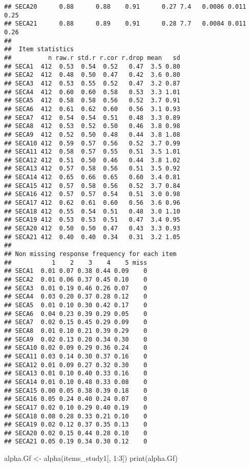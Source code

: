 \documentclass[
]{article}
\newenvironment{Shaded}{\begin{snugshade}}{\end{snugshade}}
\newcommand{\DecValTok}[1]{\textcolor[rgb]{0.00,0.00,0.81}{#1}}
\newcommand{\FunctionTok}[1]{\textcolor[rgb]{0.00,0.00,0.00}{#1}}
\newcommand{\NormalTok}[1]{#1}
\newcommand{\OtherTok}[1]{\textcolor[rgb]{0.56,0.35,0.01}{#1}}
\newcommand{\SpecialCharTok}[1]{\textcolor[rgb]{0.00,0.00,0.00}{#1}}
\begin{document}
\begin{verbatim}
## SECA20      0.88      0.88    0.91      0.27 7.4   0.0086 0.011  0.25
## SECA21      0.88      0.89    0.91      0.28 7.7   0.0084 0.011  0.26
## 
##  Item statistics 
##          n raw.r std.r r.cor r.drop mean   sd
## SECA1  412  0.53  0.54  0.52   0.47  3.5 0.80
## SECA2  412  0.48  0.50  0.47   0.42  3.6 0.80
## SECA3  412  0.53  0.55  0.52   0.47  3.2 0.87
## SECA4  412  0.60  0.60  0.58   0.53  3.3 1.01
## SECA5  412  0.58  0.58  0.56   0.52  3.7 0.91
## SECA6  412  0.61  0.62  0.60   0.56  3.1 0.93
## SECA7  412  0.54  0.54  0.51   0.48  3.3 0.89
## SECA8  412  0.53  0.52  0.50   0.46  3.8 0.98
## SECA9  412  0.52  0.50  0.48   0.44  3.8 1.08
## SECA10 412  0.59  0.57  0.56   0.52  3.7 0.99
## SECA11 412  0.58  0.57  0.55   0.51  3.5 1.01
## SECA12 412  0.51  0.50  0.46   0.44  3.8 1.02
## SECA13 412  0.57  0.58  0.56   0.51  3.5 0.92
## SECA14 412  0.65  0.66  0.65   0.60  3.4 0.81
## SECA15 412  0.57  0.58  0.56   0.52  3.7 0.84
## SECA16 412  0.57  0.57  0.54   0.51  3.0 0.98
## SECA17 412  0.62  0.61  0.60   0.56  3.6 0.96
## SECA18 412  0.55  0.54  0.51   0.48  3.0 1.10
## SECA19 412  0.53  0.53  0.51   0.47  3.4 0.95
## SECA20 412  0.50  0.50  0.47   0.43  3.3 0.93
## SECA21 412  0.40  0.40  0.34   0.31  3.2 1.05
## 
## Non missing response frequency for each item
##           1    2    3    4    5 miss
## SECA1  0.01 0.07 0.38 0.44 0.09    0
## SECA2  0.01 0.06 0.37 0.45 0.10    0
## SECA3  0.01 0.19 0.46 0.26 0.07    0
## SECA4  0.03 0.20 0.37 0.28 0.12    0
## SECA5  0.01 0.10 0.30 0.42 0.17    0
## SECA6  0.04 0.23 0.39 0.29 0.05    0
## SECA7  0.02 0.15 0.45 0.29 0.09    0
## SECA8  0.01 0.10 0.21 0.39 0.29    0
## SECA9  0.02 0.13 0.20 0.34 0.30    0
## SECA10 0.02 0.09 0.29 0.36 0.24    0
## SECA11 0.03 0.14 0.30 0.37 0.16    0
## SECA12 0.01 0.09 0.27 0.32 0.30    0
## SECA13 0.01 0.10 0.40 0.33 0.16    0
## SECA14 0.01 0.10 0.48 0.33 0.08    0
## SECA15 0.00 0.05 0.38 0.39 0.18    0
## SECA16 0.05 0.24 0.40 0.24 0.07    0
## SECA17 0.02 0.10 0.29 0.40 0.19    0
## SECA18 0.08 0.28 0.33 0.21 0.10    0
## SECA19 0.02 0.12 0.37 0.35 0.13    0
## SECA20 0.02 0.15 0.44 0.28 0.10    0
## SECA21 0.05 0.19 0.34 0.30 0.12    0
\end{verbatim}

\begin{Shaded}
\begin{Highlighting}[]
\NormalTok{alpha.Gf }\OtherTok{\textless{}{-}} \FunctionTok{alpha}\NormalTok{(items\_study1[, }\DecValTok{1}\SpecialCharTok{:}\DecValTok{3}\NormalTok{])}
\FunctionTok{print}\NormalTok{(alpha.Gf)}
\end{Highlighting}
\end{Shaded}
\end{document}
